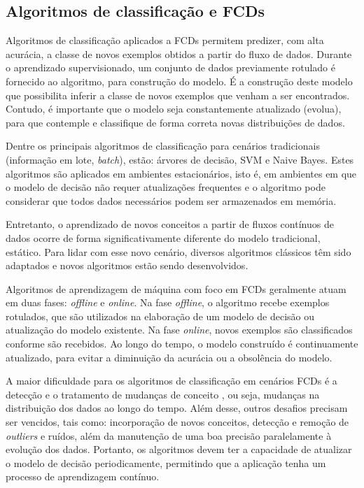 \documentclass[qual, classic, a4paper]{ufbathesis}
\begin{document}
\subsection{Algoritmos de classificação e FCDs}

Algoritmos de classificação aplicados a FCDs permitem predizer, com alta acurácia, a classe de novos exemplos obtidos a partir do fluxo de dados. 
Durante o aprendizado supervisionado, um conjunto de dados previamente rotulado é fornecido ao algoritmo, para construção do modelo. É a construção deste modelo que possibilita inferir a classe de novos exemplos que venham a ser encontrados. Contudo, é importante que o modelo seja constantemente atualizado (evolua), para que contemple e classifique de forma correta novas distribuições de dados.

Dentre os principais algoritmos de classificação para cenários tradicionais (informação em lote, \textit{batch}), estão: árvores de decisão, SVM e Naive Bayes. Estes algoritmos são aplicados em ambientes estacionários, isto é, em ambientes em que o modelo de decisão não requer atualizações frequentes e o algoritmo pode considerar que todos dados necessários podem ser armazenados em memória.

Entretanto, o aprendizado de novos conceitos a partir de fluxos contínuos de dados ocorre de forma significativamente diferente do modelo tradicional, estático. Para lidar com esse novo cenário, diversos algoritmos clássicos têm sido adaptados e novos algoritmos estão sendo desenvolvidos.

Algoritmos de aprendizagem de máquina com foco em FCDs geralmente atuam em duas fases: \textit{offline} e \textit{online}. Na fase \textit{offline}, o algoritmo recebe exemplos rotulados, que são utilizados na elaboração de um modelo de decisão ou atualização do modelo existente. Na fase \textit{online}, novos exemplos são classificados conforme são recebidos. Ao longo do tempo, o modelo construído é continuamente atualizado, para evitar a diminuição da acurácia ou a obsolência do modelo.

A maior dificuldade para os algoritmos de classificação em cenários FCDs é a detecção e o tratamento de mudanças de conceito \cite{Aggarwal:2006:DSM:1196418}, ou seja, mudanças na distribuição dos dados ao longo do tempo. 
Além desse, outros desafios precisam ser vencidos, tais como: incorporação de novos conceitos, detecção e remoção de \textit{outliers} e ruídos, além da manutenção de uma boa precisão paralelamente à evolução dos dados. Portanto, os algoritmos devem ter a capacidade de atualizar o modelo de decisão periodicamente, permitindo que a aplicação tenha um processo de aprendizagem contínuo.
\end{document}
